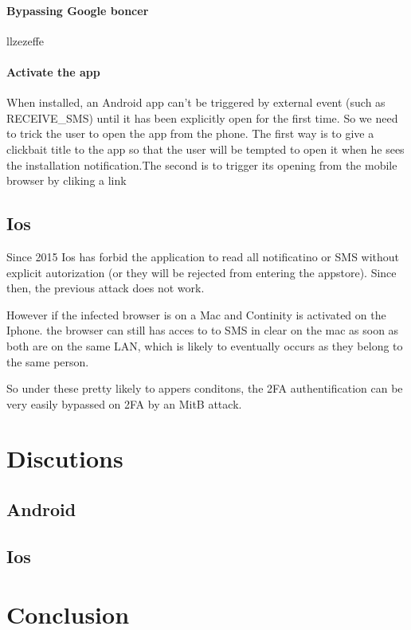 \documentclass[11pt, a4paper,twocolumn]{article}
\begin{document}
\paragraph{Bypassing Google boncer} llzezeffe

\paragraph{Activate the app} When installed, an Android app can't be triggered by external event (such as RECEIVE\_SMS) until it has been explicitly open for the first time. So we need to trick the user to open the app from the phone. The 
first way is to give a clickbait title to the app so that the user will be tempted to open it when he sees the installation notification.The second is to trigger its opening from the mobile browser by cliking a link

\subsection{Ios}
Since 2015 Ios has forbid the application to read all 
notificatino or SMS without explicit autorization (or they will be rejected from entering the appstore). 
Since then, the previous attack does not work. 

However if the infected browser is on a Mac and Continity 
is activated on the Iphone. the browser can still has acces to to SMS in clear 
on the mac as soon as both are on the same LAN, which is likely to eventually occurs
as they belong to the same person. 

So under these pretty likely to appers conditons, the 2FA authentification can 
be very easily bypassed on 2FA by an MitB attack.


\section{Discutions} 
\subsection{Android}
\subsection{Ios}
\section{Conclusion}

% 
%
\end{document}
